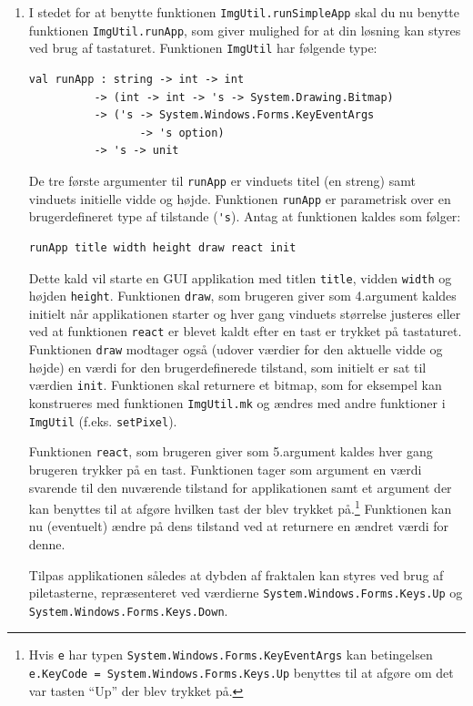 \documentclass[a4paper,12pt]{article}
\begin{document}
\begin{enumerate}[label=5ø.\arabic*,start=0]
\item\label{sierpinskikeys.ov} I stedet for at benytte funktionen
  \lstinline{ImgUtil.runSimpleApp} skal du nu benytte funktionen
  \lstinline{ImgUtil.runApp}, som giver mulighed for at din løsning
  kan styres ved brug af tastaturet. Funktionen \lstinline{ImgUtil} har følgende type:
\begin{footnotesize}
\begin{lstlisting}[numbers=none,frame=none,mathescape]
val runApp : string -> int -> int
          -> (int -> int -> 's -> System.Drawing.Bitmap)
          -> ('s -> System.Windows.Forms.KeyEventArgs
                 -> 's option)
          -> 's -> unit
\end{lstlisting}
\end{footnotesize}
De tre første argumenter til \lstinline{runApp} er vinduets titel (en
streng) samt vinduets initielle vidde og højde. Funktionen
\lstinline{runApp} er parametrisk over en brugerdefineret type af tilstande (\lstinline{'s}). Antag at funktionen kaldes som følger:
\begin{footnotesize}
\begin{lstlisting}[numbers=none,frame=none,mathescape]
  runApp title width height draw react init
\end{lstlisting}
\end{footnotesize}
Dette kald vil starte en GUI applikation med titlen \lstinline{title},
vidden \lstinline{width} og højden \lstinline{height}. Funktionen
\lstinline{draw}, som brugeren giver som 4.\@ argument kaldes initielt
når applikationen starter og hver gang vinduets størrelse justeres
eller ved at funktionen \lstinline{react} er blevet kaldt efter en
tast er trykket på tastaturet. Funktionen \lstinline{draw} modtager
også (udover værdier for den aktuelle vidde og højde) en værdi for den
brugerdefinerede tilstand, som initielt er sat til værdien
\lstinline{init}. Funktionen skal returnere et bitmap, som for
eksempel kan konstrueres med funktionen \lstinline{ImgUtil.mk} og
ændres med andre funktioner i \lstinline{ImgUtil}
(f.eks. \lstinline{setPixel}).

Funktionen \lstinline{react}, som brugeren giver som 5.\@ argument
kaldes hver gang brugeren trykker på en tast. Funktionen tager som
argument en værdi svarende til den nuværende tilstand for
applikationen samt et argument der kan benyttes til at afgøre hvilken
tast der blev trykket på.\footnote{Hvis \lstinline{e} har typen
  \lstinline{System.Windows.Forms.KeyEventArgs} kan betingelsen
  \lstinline{e.KeyCode = System.Windows.Forms.Keys.Up} benyttes til at
  afgøre om det var tasten ``Up'' der blev trykket på.} Funktionen kan
nu (eventuelt) ændre på dens tilstand ved at returnere en ændret værdi
for denne.

Tilpas applikationen således at dybden af
fraktalen kan styres ved brug af piletasterne, repræsenteret ved værdierne
\lstinline{System.Windows.Forms.Keys.Up} og
\lstinline{System.Windows.Forms.Keys.Down}.
\end{enumerate}
\end{document}
